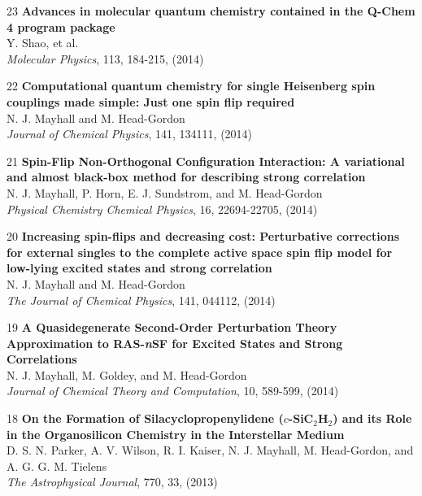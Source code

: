 \documentclass[10pt]{article}
\newenvironment{lonelist}[1][\enskip\textbullet]%
        {\vspace{-\baselineskip}\begin{list}{#1}{%
        \setlength{\partopsep}{0pt}%
        \setlength{\topsep}{0pt}}}
        {\end{list}\vspace{-.6\baselineskip}}
\def\Vhrulefill{\leavevmode\leaders\hrule height 0.7ex depth \dimexpr0.4pt-0.7ex\hfill\kern0pt}
\begin{document}
\begin{lonelist}
\item[23\hspace{4pt}] \textbf{Advances in molecular quantum chemistry contained in the Q-Chem 4 program package}\\
Y. Shao, et al.\\
\textsl{Molecular Physics}, 113, 184-215, (2014)

\item[22\hspace{4pt}] \textbf{Computational quantum chemistry for single Heisenberg spin couplings made simple: Just one spin flip required}\\
N. J. Mayhall and M. Head-Gordon\\
\textsl{Journal of Chemical Physics}, 141, 134111, (2014)



%
\item[21\hspace{4pt}] \textbf{Spin-Flip Non-Orthogonal Configuration Interaction: A variational and almost black-box method for describing strong correlation}\\
N. J. Mayhall, P. Horn, E. J. Sundstrom, and M. Head-Gordon\\
\textsl{Physical Chemistry Chemical Physics}, 16, 22694-22705, (2014)


\item[20\hspace{4pt}] \textbf{Increasing spin-flips and decreasing cost: Perturbative corrections for external singles to the complete 
		active space spin flip model for low-lying excited states and strong correlation}\\
N. J. Mayhall and M. Head-Gordon\\
\textsl{The Journal of Chemical Physics}, 141, 044112, (2014)

\item[19\hspace{4pt}] \textbf{A Quasidegenerate Second-Order Perturbation Theory Approximation to RAS-\textsl{n}SF for Excited States and Strong Correlations}\\
N. J. Mayhall, M. Goldey, and M. Head-Gordon\\
\textsl{Journal of Chemical Theory and Computation}, 10, 589-599, (2014)

\item[18\hspace{4pt}] \textbf{On the Formation of Silacyclopropenylidene ($c$-SiC$_2$H$_2$) and its Role in the Organosilicon Chemistry in the Interstellar Medium}\\
D. S. N. Parker, A. V. Wilson, R. I. Kaiser, N. J. Mayhall, M. Head-Gordon, and A. G. G. M. Tielens\\
\textsl{The Astrophysical Journal}, 770, 33, (2013)


\end{lonelist}
\end{document}
